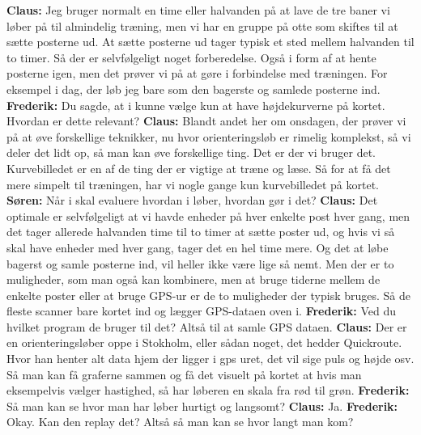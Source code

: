 \textbf{Claus:} Jeg bruger normalt en time eller halvanden på at lave de tre baner vi løber på til almindelig træning, men vi har en gruppe på otte som skiftes til at sætte posterne ud. At sætte posterne ud tager typisk et sted mellem halvanden til to timer. Så der er selvfølgeligt noget forberedelse. Også i form af at hente posterne igen, men det prøver vi på at gøre i forbindelse med træningen. For eksempel i dag, der løb jeg bare som den bagerste og samlede posterne ind.\newline
\textbf{Frederik:} Du sagde, at i kunne vælge kun at have højdekurverne på kortet. Hvordan er dette relevant?\newline
\textbf{Claus:} Blandt andet her om onsdagen, der prøver vi på at øve forskellige teknikker, nu hvor orienteringsløb er rimelig komplekst, så vi deler det lidt op, så man kan øve forskellige ting. Det er der vi bruger det. Kurvebilledet er en af de ting der er vigtige at træne og læse. Så for at få det mere simpelt til træningen, har vi nogle gange kun kurvebilledet på kortet.\newline
\textbf{Søren:} Når i skal evaluere hvordan i løber, hvordan gør i det?\newline
\textbf{Claus:} Det optimale er selvfølgeligt at vi havde enheder på hver enkelte post hver gang, men det tager allerede halvanden time til to timer at sætte poster ud, og hvis vi så skal have enheder med hver gang, tager det en hel time mere. Og det at løbe bagerst og samle posterne ind, vil heller ikke være lige så nemt. Men der er to muligheder, som man også kan kombinere, men at bruge tiderne mellem de enkelte poster eller at bruge GPS-ur er de to muligheder der typisk bruges. Så de fleste scanner bare kortet ind og lægger GPS-dataen oven i.\newline
\textbf{Frederik:}  Ved du hvilket program de bruger til det? Altså til at samle GPS dataen.\newline
\textbf{Claus:} Der er en orienteringsløber oppe i Stokholm, eller sådan noget, det hedder Quickroute. Hvor han henter alt data hjem der ligger i gps uret, det vil sige puls og højde osv. Så man kan få graferne sammen og få det visuelt på kortet at hvis man eksempelvis vælger hastighed, så har løberen en skala fra rød til grøn.\newline
\textbf{Frederik:} Så man kan se hvor man har løber hurtigt og langsomt?\newline
\textbf{Claus:} Ja. \newline
\textbf{Frederik:} Okay. Kan den replay det? Altså så man kan se hvor langt man kom?\newline
